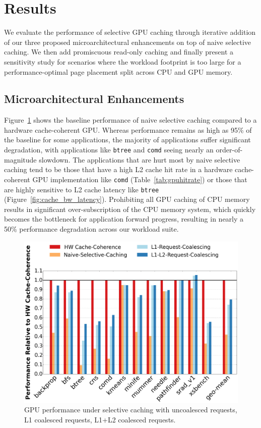\section{Results}
\label{results}
We evaluate the performance of selective GPU caching through iterative addition of our three proposed microarchitectural
enhancements on top of naive selective caching. We then add promiscuous read-only caching and 
finally present a sensitivity study for scenarios where the workload footprint is too large for a 
performance-optimal page placement split across CPU and GPU memory.

\subsection{Microarchitectural Enhancements}
Figure~\ref{fig:uncachableperformance} shows the baseline performance of naive selective caching
compared to a hardware cache-coherent GPU.  Whereas performance remains as high as 95\% of the baseline 
for some applications,
the majority of applications suffer significant degradation, with applications like \texttt{btree}
and \texttt{comd} seeing nearly an order-of-magnitude slowdown.  The applications that are hurt most
by naive selective caching tend to be those that have a high L2 cache hit rate
in a hardware cache-coherent GPU
implementation like \texttt{comd} (Table~\ref{tab:gpuhitrate}) or those that are highly sensitive to L2 cache latency
like \texttt{btree} (Figure~\ref{fig:cache_bw_latency}).  Prohibiting all GPU caching of CPU 
memory results in significant over-subscription of the CPU
memory system, which quickly becomes the bottleneck for application forward progress, resulting in
nearly a 50\% performance degradation across our workload suite.

\begin{figure}[t]
\includegraphics[width=1.0\columnwidth]{figures/unconstrainedperformance.png}
\caption{GPU performance under selective caching with uncoalesced requests, L1 coalesced requests,
L1+L2 coalesced requests.}
\label{fig:uncachableperformance}
\end{figure}


